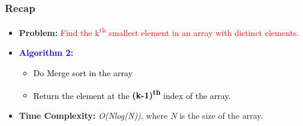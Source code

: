 \begin{frame}
    \frametitle{Recap}
    \vspace{0.3cm} %
    \begin{itemize}
        \item \textbf{Problem:} \textcolor{red}{Find the k\textsuperscript{th} smallest element in an array with distinct elements.}
        \vspace{0.3cm} %
        \item \textcolor{blue}{\textbf{Algorithm 2:}}
        \vspace{0.2cm} %
        \begin{itemize}
            \item \textcolor{black}{Do Merge sort in the array}
            \item \textcolor{black}{Return the element at the \textbf{(k-1)\textsuperscript{th}} index of the array.}
        \end{itemize}
         \item \textbf{Time Complexity:} \textit{O(Nlog(N))}, where \textit{N} is the size of the array.
    \end{itemize}
    \vspace{0.5cm} %
\end{frame}

